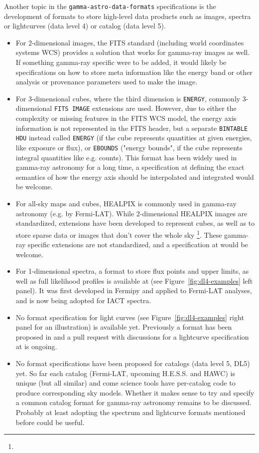 Another topic in the \texttt{gamma-astro-data-formats} specifications is the development of formats to store high-level data products such as images, spectra or lightcurves (data level 4) or catalog (data level 5).

\begin{itemize}
\item{} For 2-dimensional images, the FITS standard (including world coordinates systems WCS) provides a solution that works for gamma-ray images as well. If something gamma-ray specific were to be added, it would likely be specifications on how to store meta information like the energy band or other analysis or provenance parameters used to make the image.
\item{} For 3-dimensional cubes, where the third dimension is \texttt{ENERGY}, commonly 3-dimensional \texttt{FITS IMAGE} extensions are used. However, due to either the complexity or missing features in the FITS WCS model, the energy axis information is not represented in the FITS header, but a separate \texttt{BINTABLE HDU} instead called \texttt{ENERGY} (if the cube represents quantities at given energies, like exposure or flux), or \texttt{EBOUNDS} ("energy bounds", if the cube represents integral quantities like e.g. counts).
This format has been widely used in gamma-ray astronomy for a long time, a specification at \gadf defining the exact semantics of how the energy axis should be interpolated and integrated would be welcome.
\item{} For all-sky maps and cubes, HEALPIX is commonly used in gamma-ray astronomy (e.g. by Fermi-LAT). While 2-dimensional HEALPIX images are standardized, extensions have been developed to represent cubes, as well as to store sparse data or images that don't cover the whole sky \footnote{\pointlikedata}. These gamma-ray specific extensions are not standardized, and a specification at \gadf would be welcome.
\item{} For 1-dimensional spectra, a format to store flux points and upper limits, as well as full likelihood profiles is available at \gadf (see Figure~\ref{fig:dl4-examples} left panel). It was first developed in Fermipy and applied to Fermi-LAT analyses, and is now being adopted for IACT spectra.
\item{} No format specification for light curves (see Figure~\ref{fig:dl4-examples} right panel for an illustration) is available yet. Previously a format has been proposed in \cite{2010AnA...524A..48T} and a pull request with discussions for a lightcurve specification at \gadf is ongoing.
\item{} No format specifications have been proposed for catalogs (data level 5, DL5) yet. So far each catalog (Fermi-LAT, upcoming H.E.S.S. and HAWC) is unique (but all similar) and come science tools have per-catalog code to produce corresponding sky models. Whether it makes sense to try and specify a common catalog format for gamma-ray astronomy remains to be discussed. Probably at least adopting the spectrum and lightcurve formats mentioned before could be useful.
\end{itemize}

